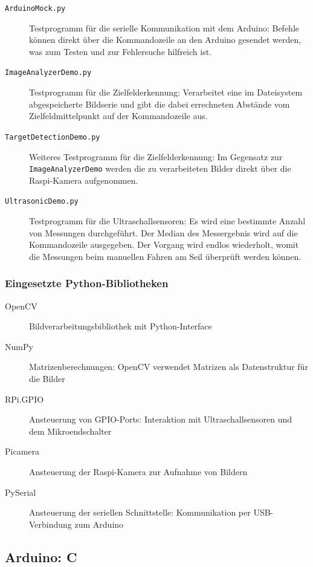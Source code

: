 \begin{description}
    \item[\texttt{ArduinoMock.py}] Testprogramm für die serielle Kommunikation mit dem Arduino: Befehle können direkt über die Kommandozeile an den Arduino gesendet werden, was zum Testen und zur Fehlersuche hilfreich ist.
    \item[\texttt{ImageAnalyzerDemo.py}] Testprogramm für die Zielfelderkennung: Verarbeitet eine im Dateisystem abgespeicherte Bildserie und gibt die dabei errechneten Abstände vom Zielfeldmittelpunkt auf der Kommandozeile aus.
    \item[\texttt{TargetDetectionDemo.py}] Weiteres Testprogramm für die Zielfelderkennung: Im Gegensatz zur \texttt{ImageAnalyzerDemo} werden die zu verarbeiteten Bilder direkt über die Raspi-Kamera aufgenommen.
    \item[\texttt{UltrasonicDemo.py}] Testprogramm für die Ultraschallsensoren: Es wird eine bestimmte Anzahl von Messungen durchgeführt. Der Median des Messergebnis wird auf die Kommandozeile ausgegeben. Der Vorgang wird endlos wiederholt, womit die Messungen beim manuellen Fahren am Seil überprüft werden können.
\end{description}

\subsubsection{Eingesetzte Python-Bibliotheken}

\begin{description}
    \item[OpenCV] Bildverarbeitungsbibliothek mit Python-Interface \cite{opencv}
    \item[NumPy] Matrizenberechnungen: OpenCV verwendet Matrizen als Datenstruktur für die Bilder \cite{numpy}
    \item[RPi.GPIO] Ansteuerung von GPIO-Ports: Interaktion mit Ultraschallsensoren und dem Mikroendschalter \cite{rpigpio}
    \item[Picamera] Ansteuerung der Raspi-Kamera zur Aufnahme von Bildern \cite{picamera}
    \item[PySerial] Ansteuerung der seriellen Schnittstelle: Kommunikation per USB-Verbindung zum Arduino \cite{pyserial}
\end{description}

\subsection{Arduino: C}

